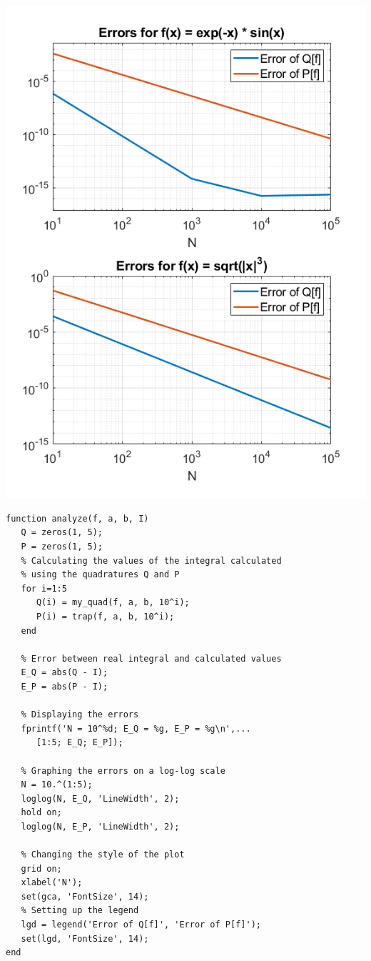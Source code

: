 \documentclass{article}
\begin{document}
\begin{center}
   \includegraphics[scale=0.6]{figure.png}
\end{center}

\begin{Verbatim}[frame=single,
   label=\textsc{Matlab} code - analyze.m]
function analyze(f, a, b, I)
   Q = zeros(1, 5);
   P = zeros(1, 5);
   % Calculating the values of the integral calculated
   % using the quadratures Q and P
   for i=1:5
      Q(i) = my_quad(f, a, b, 10^i);
      P(i) = trap(f, a, b, 10^i);
   end

   % Error between real integral and calculated values
   E_Q = abs(Q - I);
   E_P = abs(P - I);

   % Displaying the errors
   fprintf('N = 10^%d; E_Q = %g, E_P = %g\n',...
      [1:5; E_Q; E_P]); 

   % Graphing the errors on a log-log scale
   N = 10.^(1:5);
   loglog(N, E_Q, 'LineWidth', 2);
   hold on;
   loglog(N, E_P, 'LineWidth', 2);

   % Changing the style of the plot
   grid on;
   xlabel('N');
   set(gca, 'FontSize', 14);
   % Setting up the legend
   lgd = legend('Error of Q[f]', 'Error of P[f]');
   set(lgd, 'FontSize', 14);
end
\end{Verbatim}
\end{document}
